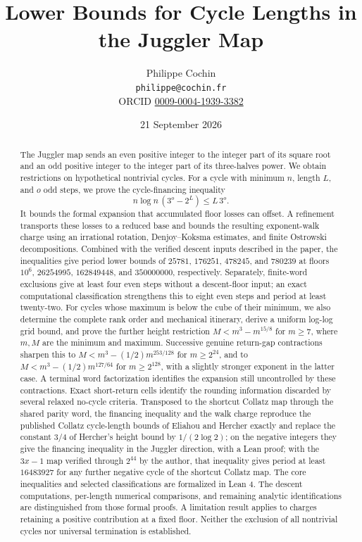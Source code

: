 \documentclass[12pt]{article}
\title{Lower Bounds for Cycle Lengths in the Juggler Map}
\author{Philippe Cochin \\ \texttt{philippe@cochin.fr} \\
  \small ORCID \href{https://orcid.org/0009-0004-1939-3382}{0009-0004-1939-3382}}
\date{21 September 2026}
\begin{document}
\maketitle
\begin{abstract}

The Juggler map sends an even positive integer to the integer part of
its square root and an odd positive integer to the integer part of its
three-halves power. We obtain restrictions on hypothetical nontrivial
cycles. For a cycle with minimum \(n\), length \(L\), and \(o\) odd
steps, we prove the cycle-financing inequality \[
n\log n\,(3^o-2^L)\le L\,3^o.
\] It bounds the formal expansion that accumulated floor losses can
offset. A refinement transports these losses to a reduced base and
bounds the resulting exponent-walk charge using an irrational rotation,
Denjoy--Koksma estimates, and finite Ostrowski decompositions. Combined
with the verified descent inputs described in the paper, the
inequalities give period lower bounds of \(25781\), \(176251\),
\(478245\), and \(780239\) at floors \(10^6\), \(26254995\),
\(162849448\), and \(350000000\), respectively. Separately, finite-word
exclusions give at least four even steps without a descent-floor input;
an exact computational classification strengthens this to eight even
steps and period at least twenty-two. For cycles whose maximum is below
the cube of their minimum, we also determine the complete rank order and
mechanical itinerary, derive a uniform log-log grid bound, and prove the
further height restriction \(M<m^3-m^{15/8}\) for \(m\ge7\), where
\(m,M\) are the minimum and maximum. Successive genuine return-gap
contractions sharpen this to \(M<m^3-(1/2)m^{253/128}\) for
\(m\ge2^{24}\), and to \(M<m^3-(1/2)m^{127/64}\) for \(m\ge2^{128}\),
with a slightly stronger exponent in the latter case. A terminal word
factorization identifies the expansion still uncontrolled by these
contractions. Exact short-return cells identify the rounding information
discarded by several relaxed no-cycle criteria. Transposed to the
shortcut Collatz map through the shared parity word, the financing
inequality and the walk charge reproduce the published Collatz
cycle-length bounds of Eliahou and Hercher exactly and replace the
constant \(3/4\) of Hercher's height bound by \(1/(2\log 2)\); on the
negative integers they give the financing inequality in the Juggler
direction, with a Lean proof; with the \(3x-1\) map verified through
\(2^{44}\) by the author, that inequality gives period at least
\(16483927\) for any further negative cycle of the shortcut Collatz map.
The core inequalities and selected classifications are formalized in
Lean 4. The descent computations, per-length numerical comparisons, and
remaining analytic identifications are distinguished from those formal
proofs. A limitation result applies to charges retaining a positive
contribution at a fixed floor. Neither the exclusion of all nontrivial
cycles nor universal termination is established.

\end{abstract}
\end{document}
